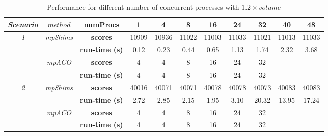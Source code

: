 \documentclass[preprint,authoryear]{elsarticle}
\begin{document}
\begin{table}[H]
	\centering
	\caption{Performance for different number of concurrent processes with $1.2 \times volume$}  \label{tab:procs}
	\scriptsize
	\begin{tabular}{c| c | c | c c c c c c c c }
	\toprule
	{\it Scenario} & $method$ &{\bf numProcs}    & \textbf{1} & \textbf{4} & \textbf{8} & \textbf{16} & \textbf{24} & \textbf{32} & \textbf{40} & \textbf{48}  \\
	\toprule
	\multirow{4}{*}{\it {1}}  &\multirow{2}{*}{\it {mpShims}}  &{\bf scores}      & 10909 & 10936 & 11022 & 11003 & 11033 & 11021 & 11013 & 11033 \\
	                          &                                &{\bf run-time (s)}& 0.12 & 0.23 & 0.44 & 0.65 & 1.13 & 1.74 & 2.32 & 3.68  \\
                              \cmidrule{2-11}
	                          &\multirow{2}{*}{\it {mpACO}}    &{\bf scores}               & 4 & 4 & 8 & 16 & 24 & 32&& \\
	                          &                                &{\bf run-time (s)}& 4 & 4 & 8 & 16 & 24 & 32&& \\
	\cmidrule{1-11}
	\multirow{4}{*}{\it {2}}  &\multirow{2}{*}{\it {mpShims}} &{\bf scores}       & 40016 & 40071 & 40071 & 40078 & 40078 & 40073 & 40083 & 40083 \\
	                          &                               &{\bf run-time (s)} & 2.72 & 2.85 & 2.15 & 1.95 & 3.10 & 20.32 & 13.95 & 17.24  \\
                              \cmidrule{2-11}
	                          &\multirow{2}{*}{\it {mpACO}}   &{\bf scores}       & 4 & 4 & 8 & 16 & 24 & 32&& \\
	                          &   &{\bf run-time (s)}         & 4 & 4 & 8 & 16 & 24 & 32&& \\				
	\bottomrule		
\end{tabular}

\normalsize

\end{table}
\end{document}
